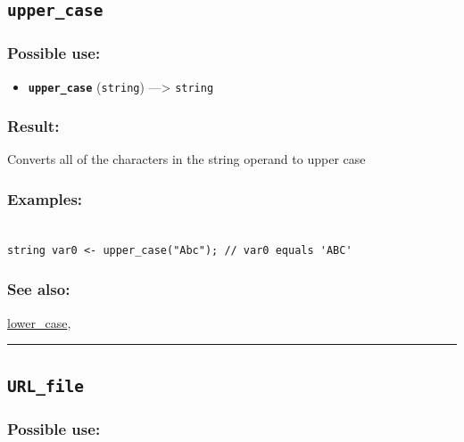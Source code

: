 \documentclass[]{book}
\providecommand{\tightlist}{%
  \setlength{\itemsep}{0pt}\setlength{\parskip}{0pt}}
\theoremstyle{definition}
\theoremstyle{definition}
\theoremstyle{definition}
\theoremstyle{remark}
\begin{document}
\subsection{\texorpdfstring{\texttt{upper\_case}}{upper\_case}}\label{upper_case}

\subsubsection{Possible use:}\label{possible-use-543}

\begin{itemize}
\tightlist
\item
  \textbf{\texttt{upper\_case}} (\texttt{string}) ---\textgreater{}
  \texttt{string}
\end{itemize}

\subsubsection{Result:}\label{result-523}

Converts all of the characters in the string operand to upper case

\subsubsection{Examples:}\label{examples-375}

\begin{verbatim}
 
string var0 <- upper_case("Abc"); // var0 equals 'ABC'
\end{verbatim}

\subsubsection{See also:}\label{see-also-215}

\href{operators-i-to-m.html\#lower_case}{lower\_case},

\begin{center}\rule{0.5\linewidth}{\linethickness}\end{center}

\subsection{\texorpdfstring{\texttt{URL\_file}}{URL\_file}}\label{url_file}

\subsubsection{Possible use:}\label{possible-use-544}
\end{document}
